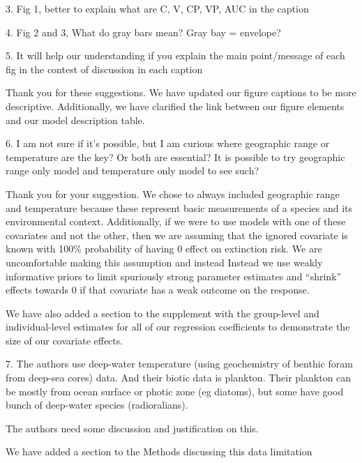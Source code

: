 \documentclass[12pt,letterpaper]{article}
\begin{document}
\begin{refsection}
\begin{bfseries}
  3. Fig 1, better to explain what are C, V, CP, VP, AUC in the caption

  4. Fig 2 and 3, What do gray bars mean? Gray bay = envelope?

  5. It will help our understanding if you explain the main point/message of each fig in the contest of discussion in each caption 
\end{bfseries}

Thank you for these suggestions. We have updated our figure captions to be more descriptive. Additionally, we have clarified the link between our figure elements and our model description table.

\begin{bfseries}
  6. I am not sure if it’s possible, but I am curious where geographic range or temperature are the key? Or both are essential? It is possible to try geographic range only model and temperature only model to see such?
\end{bfseries}

Thank you for your suggestion. We chose to always included geographic range and temperature because these represent basic measurements of a species and its environmental context. Additionally, if we were to use models with one of these covariates and not the other, then we are assuming that the ignored covariate is known with 100\% probability of having 0 effect on extinction risk. We are uncomfortable making this assumption and instead Instead we use weakly informative priors to limit spuriously strong parameter estimates and ``shrink'' effects towards 0 if that covariate has a weak outcome on the response.

We have also added a section to the supplement with the group-level and individual-level estimates for all of our regression coefficients to demonstrate the size of our covariate effects.

\begin{bfseries}
  7. The authors use deep-water temperature (using geochemistry of benthic foram from deep-sea cores) data. And their biotic data is plankton. Their plankton can be mostly from ocean surface or photic zone (eg diatoms), but some have good bunch of deep-water species (radioralians).

  The authors need some discussion and justification on this.
\end{bfseries}

We have added a section to the Methods discussing this data limitation


\end{refsection}
\end{document}

